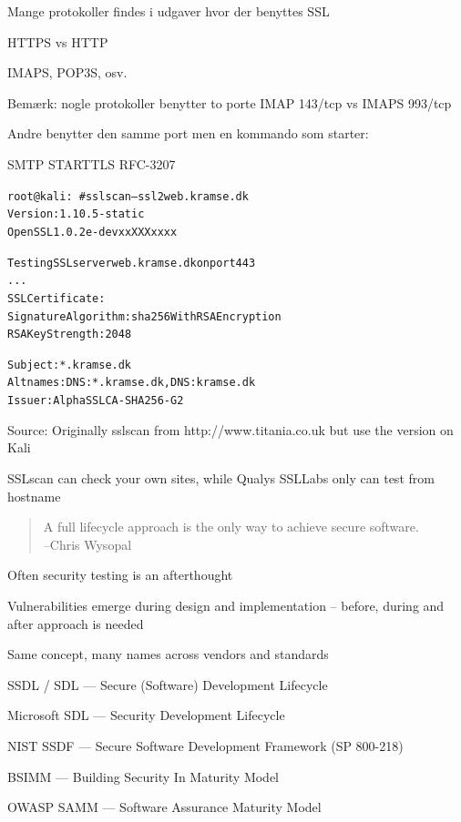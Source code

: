 \documentclass[Screen16to9,17pt]{foils}
\begin{document}

\begin{list1}
\item Mange protokoller findes i udgaver hvor der benyttes SSL
\item HTTPS vs HTTP
\item IMAPS, POP3S, osv.
\item Bemærk: nogle protokoller benytter to porte IMAP 143/tcp vs IMAPS 993/tcp
\item Andre benytter den samme port men en kommando som starter:
\item SMTP STARTTLS RFC-3207
\end{list1}




\begin{alltt}\small
root@kali:~# sslscan --ssl2 web.kramse.dk
Version: 1.10.5-static
OpenSSL 1.0.2e-dev xx XXX xxxx

Testing SSL server web.kramse.dk on port 443
...
  SSL Certificate:
Signature Algorithm: sha256WithRSAEncryption
RSA Key Strength:    2048

Subject:  *.kramse.dk
Altnames: DNS:*.kramse.dk, DNS:kramse.dk
Issuer:   AlphaSSL CA - SHA256 - G2
\end{alltt}

Source:
Originally sslscan from http://www.titania.co.uk
 but use the version on Kali

SSLscan can check your own sites, while Qualys SSLLabs only can test from hostname




\begin{quote}
  A full lifecycle approach is the only way to achieve secure software.\\
  --Chris Wysopal
\end{quote}

\begin{list2}
\item Often security testing is an afterthought
\item Vulnerabilities emerge during design and implementation -- before, during and after approach is needed
\end{list2}


\begin{list2}
\item Same concept, many names across vendors and standards
\item SSDL / SDL --- Secure (Software) Development Lifecycle
\item Microsoft SDL --- Security Development Lifecycle
\item NIST SSDF --- Secure Software Development Framework (SP 800-218)
\item BSIMM --- Building Security In Maturity Model
\item OWASP SAMM --- Software Assurance Maturity Model
\end{list2}
\end{document}
